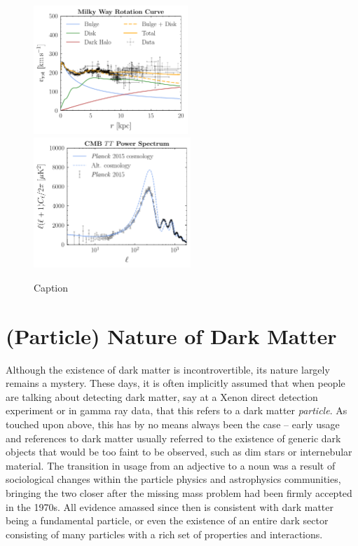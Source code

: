 \begin{figure}[htbp] 
\hspace{-0.9 cm} 
\includegraphics[width=0.5185\textwidth]{rotcurves.pdf}
 \includegraphics[width=0.528\textwidth]{cells.pdf}  
\caption{Caption}  
\label{fig:evidence}
\end{figure}


\section{(Particle) Nature of Dark Matter}
\label{sec:particledm}

Although the existence of dark matter is incontrovertible, its nature largely remains a mystery. These days, it is often implicitly assumed that when people are talking about detecting dark matter, say at a Xenon direct detection experiment or in gamma ray data, that this refers to a dark matter \emph{particle}. As touched upon above, this has by no means always been the case -- early usage and references to dark matter usually referred to the existence of generic dark objects that would be too faint to be observed, such as dim stars or internebular material. The transition in usage from an adjective to a noun was a result of sociological changes within the particle physics and astrophysics communities, bringing the two closer after the missing mass problem had been firmly accepted in the 1970s. All evidence amassed since then is consistent with dark matter being a fundamental particle, or even the existence of an entire dark sector consisting of many particles with a rich set of properties and interactions.

